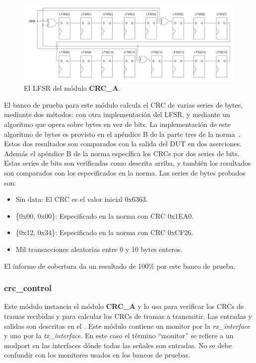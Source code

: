 \documentclass[a4paper, twoside, 11pt]{report}
\begin{document}
\begin{figure}[htb]
  \centering
  \includegraphics[width=1.0\textwidth]{./img/crc_a_lfsr}
  \caption{El LFSR del módulo \textbf{CRC\_A}.}
  \label{fig:crc_lfsr}
\end{figure}

El banco de prueba para este módulo calcula el CRC de varias series de bytes, mediante dos métodos: con otra implementación del LFSR, y mediante un algoritmo que opera sobre bytes en vez de bits. La implementación de este algoritmo de bytes es provisto en el apéndice B de la parte tres de la norma~\cite{iso14443-3}. Estos dos resultados son comparados con la salida del DUT en dos aserciones. Además el apéndice B de la norma específica los CRCs por dos series de bits. Estas series de bits son verificadas como descrita arriba, y también los resultados son comparados con los especificados en la norma. Las series de bytes probados son:

\begin{itemize}
  \item Sin data: El CRC es el valor inicial 0x6363.
  \item \{0x00, 0x00\}: Especificado en la norma con CRC 0x1EA0.
  \item \{0x12, 0x34\}: Especificado en la norma con CRC 0xCF26.
  \item Mil transacciones aleatorias entre 0 y 10 bytes enteros.
\end{itemize}

El informe de cobertura da un resultado de 100\% por este banco de prueba.

\FloatBarrier
\subsubsection{crc\_control}

Este módulo instancia el módulo \textbf{CRC\_A} y lo usa para verificar los CRCs de tramas recibidas y para calcular los CRCs de tramas a transmitir. Las entradas y salidas son descritas en el . Este módulo contiene un monitor por la \textit{rx\_interface} y uno por la \textit{tx\_interface}. En este caso el término “monitor” se refiere a un modport en las interfaces dónde todas las señales son entradas. No se debe confundir con los monitores usados en los bancos de pruebas.
\end{document}

